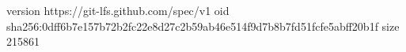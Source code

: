 version https://git-lfs.github.com/spec/v1
oid sha256:0dff6b7e157b72b2fc22e8d27c2b59ab46e514f9d7b8b7fd51fcfe5abff20b1f
size 215861
